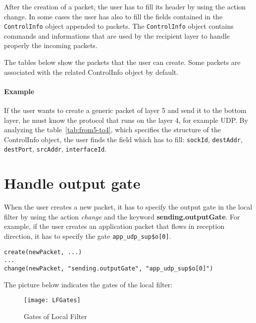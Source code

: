 After the creation of a packet, the user has to fill its header by using the action change. In some cases the user has also to fill the fields contained in the \texttt{ControlInfo} object appended to packets. The \texttt{ControlInfo} object contains commands and informations that are used by the recipient layer to handle properly the incoming packets.

The tables below show the packets that the user can create. Some packets are associated with the related ControlInfo object by default.

\paragraph{Example}
If the user wants to create a generic packet of layer 5 and send it to the bottom layer, he must know the protocol that runs on the layer 4, for example UDP. By analyzing the table~\ref{tab:from5-to4}, which specifies the structure of the ControlInfo object, the user finds the field which has to fill: \texttt{sockId}, \texttt{destAddr}, \texttt{destPort}, \texttt{srcAddr}, \texttt{interfaceId}.


\section{Handle output gate}
When the user creates a new packet, it has to specify the output gate in the local filter by using the action \emph{change} and the keyword \textbf{sending.outputGate}. For example, if the user creates an application packet that flows in reception direction, it has to specify the gate \texttt{app\_udp\_sup\$o[0]}.
%
\begin{lstlisting}[language={asl}, caption={Handle output gate example}]
create(newPacket, ...)
...
change(newPacket, "sending.outputGate", "app_udp_sup$o[0]")
\end{lstlisting}


The picture below indicates the gates of the local filter:

\begin{figure}[h]
\centering
\texttt{[image: LFGates]}
\caption{Gates of Local Filter}
\label{img:LFGates}
\end{figure}



